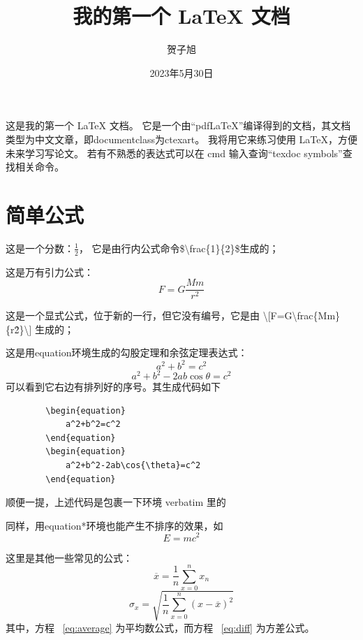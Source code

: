\documentclass[UTF8]{ctexart}
\title{我的第一个 \LaTeX{} 文档}
\author{贺子旭}
\date{2023年5月30日}
\begin{document}
\maketitle

这是我的第一个 \LaTeX{} 文档。
它是一个由“pdfLaTeX”编译得到的文档，其文档类型为中文文章，即documentclass为ctexart。
我将用它来练习使用 \LaTeX ，方便未来学习写论文。
若有不熟悉的表达式可以在 cmd 输入查询“texdoc symbols”查找相关命令。

\tableofcontents

\newpage

\section{简单公式}
	这是一个分数：$\frac{1}{2}$，
	它是由行内公式命令\$\textbackslash frac\{1\}\{2\}\$生成的；

	这是万有引力公式：
		\[F=G\frac{Mm}{r^2}\]

	这是一个显式公式，位于新的一行，但它没有编号，它是由
	\textbackslash[F=G\textbackslash frac\{Mm\}\{r\^2\}\textbackslash]
	生成的；

	这是用equation环境生成的勾股定理和余弦定理表达式：
	\begin{equation}
		a^2+b^2=c^2
	\end{equation}
	\begin{equation}
		a^2+b^2-2ab\cos{\theta}=c^2
	\end{equation}
	可以看到它右边有排列好的序号。其生成代码如下

	\begin{verbatim}
		\begin{equation}
			a^2+b^2=c^2
		\end{equation}
		\begin{equation}
			a^2+b^2-2ab\cos{\theta}=c^2
		\end{equation}
	\end{verbatim}

	顺便一提，上述代码是包裹一下环境 verbatim 里的

	同样，用equation*环境也能产生不排序的效果，如
	\begin{equation*}
		E = mc^2
	\end{equation*}

	这里是其他一些常见的公式：
	\begin{equation}
		\overline{x}=\frac{1}{n}\sum^{n}_{x=0}{x_{n}}
		\label{eq:average}
	\end{equation}
	\begin{equation}
		\sigma_{x}=\sqrt{\frac{1}{n}\sum^{n}_{x=0}{(x-\overline x)^2}}
		\label{eq:diff}
	\end{equation}
	其中，方程 ~\ref{eq:average} 为平均数公式，而方程 ~\ref{eq:diff} 为方差公式。
\end{document}
